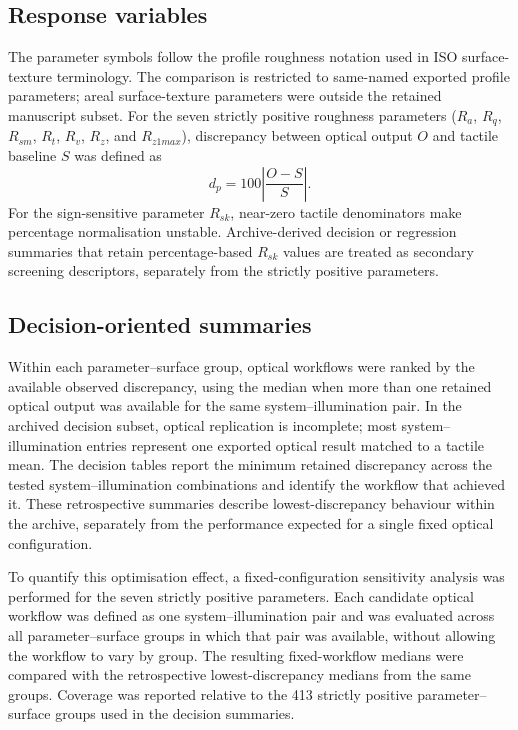 \documentclass{article}
\begin{document}
\subsection{Response variables}
The parameter symbols follow the profile roughness notation used in ISO surface-texture terminology. The comparison is restricted to same-named exported profile parameters; areal surface-texture parameters were outside the retained manuscript subset. For the seven strictly positive roughness parameters ($R_a$, $R_q$, $R_{sm}$, $R_t$, $R_v$, $R_z$, and $R_{z1max}$), discrepancy between optical output $O$ and tactile baseline $S$ was defined as
\begin{equation}
d_p = 100\left|\frac{O-S}{S}\right|.
\label{eq:diff}
\end{equation}
For the sign-sensitive parameter $R_{sk}$, near-zero tactile denominators make percentage normalisation unstable. Archive-derived decision or regression summaries that retain percentage-based $R_{sk}$ values are treated as secondary screening descriptors, separately from the strictly positive parameters.

\subsection{Decision-oriented summaries}
Within each parameter--surface group, optical workflows were ranked by the available observed discrepancy, using the median when more than one retained optical output was available for the same system--illumination pair. In the archived decision subset, optical replication is incomplete; most system--illumination entries represent one exported optical result matched to a tactile mean. The decision tables report the minimum retained discrepancy across the tested system--illumination combinations and identify the workflow that achieved it. These retrospective summaries describe lowest-discrepancy behaviour within the archive, separately from the performance expected for a single fixed optical configuration.

To quantify this optimisation effect, a fixed-configuration sensitivity analysis was performed for the seven strictly positive parameters. Each candidate optical workflow was defined as one system--illumination pair and was evaluated across all parameter--surface groups in which that pair was available, without allowing the workflow to vary by group. The resulting fixed-workflow medians were compared with the retrospective lowest-discrepancy medians from the same groups. Coverage was reported relative to the 413 strictly positive parameter--surface groups used in the decision summaries.
\end{document}
